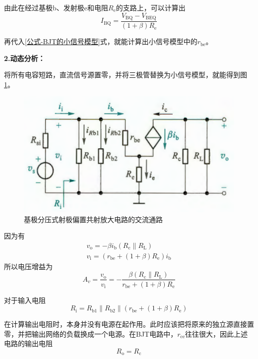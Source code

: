 由此在经过基极b、发射极e和电阻$R_\mathrm{e}$的支路上，可以计算出
\begin{equation}
    I_{\mathrm{BQ}}=\frac{V_{\mathrm{BQ}}-V_{\mathrm{BEQ}}}{(1+\beta)R_{\mathrm{e}}}
\end{equation}

再代入\ref{公式-BJT的小信号模型}式，就能计算出小信号模型中的$r_\mathrm{be}$。

\textbf{2.动态分析：}

将所有电容短路，直流信号源置零，并将三极管替换为小信号模型，就能得到图\ref{基极分压射极偏置电路-交流通路}。

\begin{figure}[htb]
    \centering
    \includegraphics[width=0.5\linewidth]{pic/基极分压射极偏置电路-交流通路.png}
    \caption{基极分压式射极偏置共射放大电路的交流通路\cite{康华光}\label{基极分压射极偏置电路-交流通路}}
\end{figure}

因为有
\begin{align}
    v_\mathrm{o}=-\beta i_\mathrm{b} (R_\mathrm{c}\parallel R_\mathrm{L}) \\
    v_\mathrm{i}=(r_\mathrm{be}+(1+\beta)R_\mathrm{e})i_\mathrm{b}
\end{align}
所以电压增益为
\begin{equation}\label{公式-共射放大电路增益}
    A_v=\frac{v_\mathrm{o}}{v_\mathrm{i}}=-\frac{\beta (R_\mathrm{c}\parallel R_\mathrm{L})}{r_\mathrm{be}+(1+\beta)R_\mathrm{e}}
\end{equation}

对于输入电阻
\begin{equation}
    R_\mathrm{i}=R_\mathrm{b1} \parallel R_\mathrm{b2} \parallel (r_\mathrm{be}+(1+\beta)R_\mathrm{e})
\end{equation}

在计算输出电阻时，本身并没有电源在起作用。此时应该把将原来的独立源直接置零，并把输出网络的负载换成一个电源。在BJT电路中，$r_\mathrm{ce}$往往很大，因此上述电路的输出电阻
\begin{equation}
    R_\mathrm{o}=R_\mathrm{c}
\end{equation}

